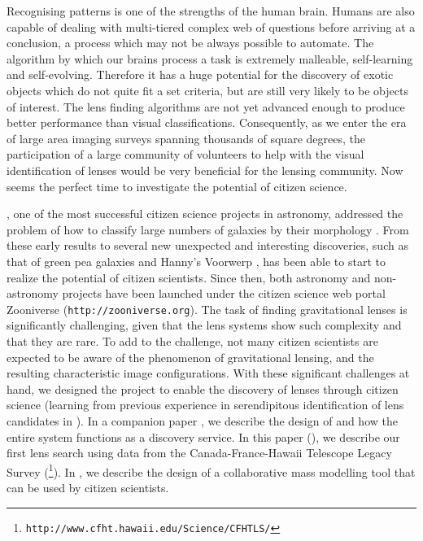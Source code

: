 \documentclass[useAMS,usenatbib,a4paper]{mn2e}
\begin{document}
Recognising patterns is one of the
strengths of the human brain. Humans are also capable of dealing with
multi-tiered complex web of questions before arriving at a conclusion, a process
which may
not be always possible to automate. The algorithm by which our brains process a
task is extremely malleable, self-learning and self-evolving. Therefore it has
a huge potential for the discovery of exotic objects which do not quite fit a
set criteria, but are still very likely to be objects of interest. The lens
finding algorithms are not yet advanced enough to produce better performance
than visual classifications. Consequently, as we enter the era of
large area imaging surveys spanning thousands of square degrees,
the participation of a large community of
volunteers to help with the visual identification of lenses would be very
beneficial for the lensing community.  Now seems
the perfect time to investigate the potential of citizen science.

\GZ, one of the most successful citizen science projects in
astronomy, addressed
the problem of how to  classify large numbers of galaxies by their
morphology \citep{Lintott2008}.
From these early results to several new unexpected and
interesting discoveries, such as that of green pea galaxies
\citep{Cardamone2009,Jaskot2013} and Hanny's Voorwerp
\citep{Lintott2009,Keel2012}, \GZ has been able to start to realize the potential
of citizen scientists.  Since then, both astronomy and non-astronomy projects
have been launched under the citizen science web portal Zooniverse
(\texttt{http://zooniverse.org}). The task of finding gravitational lenses is
significantly challenging, given that the lens systems show such
complexity and that they are rare. To add to the challenge, not many
citizen scientists are expected to be aware of the phenomenon of
gravitational lensing, and the resulting characteristic image configurations.  With
these significant challenges at hand, we designed the \sw project to
enable the discovery of lenses through citizen science (learning from
previous experience in serendipitous identification of lens candidates in \GZ).
In a companion
paper \citep[][hereafter \PaperOne]{Marshall2015}, we describe the design of
\sw and how the entire system functions as a discovery service.  In this
paper (\PaperTwo), we describe our first lens search using data
from the Canada-France-Hawaii Telescope Legacy Survey
(\cfhtls\footnote{\texttt{http://www.cfht.hawaii.edu/Science/CFHTLS/}}).
In \citet{Kung2015}, we describe the design of a collaborative
mass modelling tool that can be used by citizen scientists.
\end{document}
